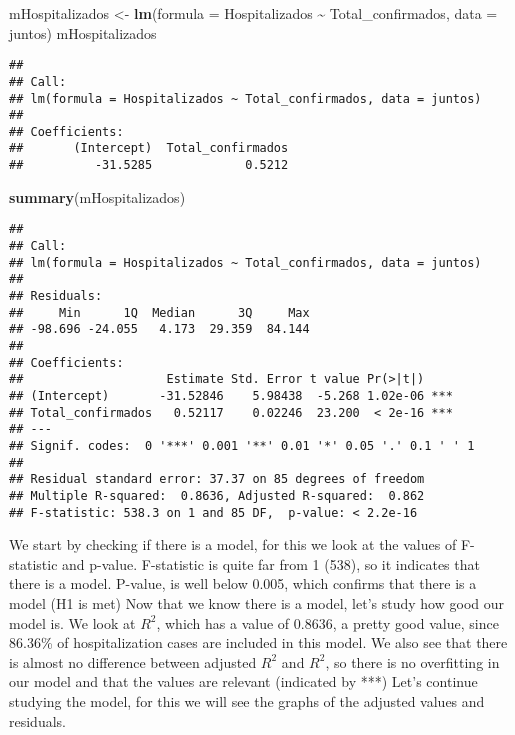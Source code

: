 \documentclass[
]{book}
\newenvironment{Shaded}{\begin{snugshade}}{\end{snugshade}}
\newcommand{\DataTypeTok}[1]{\textcolor[rgb]{0.13,0.29,0.53}{#1}}
\newcommand{\KeywordTok}[1]{\textcolor[rgb]{0.13,0.29,0.53}{\textbf{#1}}}
\newcommand{\NormalTok}[1]{#1}
\newcommand{\OperatorTok}[1]{\textcolor[rgb]{0.81,0.36,0.00}{\textbf{#1}}}
\newcommand{\StringTok}[1]{\textcolor[rgb]{0.31,0.60,0.02}{#1}}
\begin{document}
\begin{Shaded}
\begin{Highlighting}[]
\NormalTok{mHospitalizados \textless{}{-}}\StringTok{ }\KeywordTok{lm}\NormalTok{(}\DataTypeTok{formula =}\NormalTok{ Hospitalizados }\OperatorTok{\textasciitilde{}}\StringTok{ }\NormalTok{Total\_confirmados, }\DataTypeTok{data =}\NormalTok{ juntos)}
\NormalTok{mHospitalizados}
\end{Highlighting}
\end{Shaded}

\begin{verbatim}
## 
## Call:
## lm(formula = Hospitalizados ~ Total_confirmados, data = juntos)
## 
## Coefficients:
##       (Intercept)  Total_confirmados  
##          -31.5285             0.5212
\end{verbatim}

\begin{Shaded}
\begin{Highlighting}[]
\KeywordTok{summary}\NormalTok{(mHospitalizados)}
\end{Highlighting}
\end{Shaded}

\begin{verbatim}
## 
## Call:
## lm(formula = Hospitalizados ~ Total_confirmados, data = juntos)
## 
## Residuals:
##     Min      1Q  Median      3Q     Max 
## -98.696 -24.055   4.173  29.359  84.144 
## 
## Coefficients:
##                    Estimate Std. Error t value Pr(>|t|)    
## (Intercept)       -31.52846    5.98438  -5.268 1.02e-06 ***
## Total_confirmados   0.52117    0.02246  23.200  < 2e-16 ***
## ---
## Signif. codes:  0 '***' 0.001 '**' 0.01 '*' 0.05 '.' 0.1 ' ' 1
## 
## Residual standard error: 37.37 on 85 degrees of freedom
## Multiple R-squared:  0.8636, Adjusted R-squared:  0.862 
## F-statistic: 538.3 on 1 and 85 DF,  p-value: < 2.2e-16
\end{verbatim}

We start by checking if there is a model, for this we look at the values of F-statistic and p-value.
F-statistic is quite far from 1 (538), so it indicates that there is a model.
P-value, is well below 0.005, which confirms that there is a model (H1 is met)
Now that we know there is a model, let's study how good our model is.
We look at \(R^2\), which has a value of 0.8636, a pretty good value, since 86.36\% of hospitalization cases are included in this model.
We also see that there is almost no difference between adjusted \(R^2\) and \(R^2\), so there is no overfitting in our model and that the values are relevant (indicated by ***)
Let's continue studying the model, for this we will see the graphs of the adjusted values and residuals.
\end{document}
